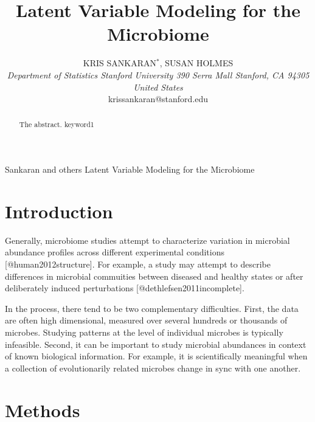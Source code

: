 \documentclass[oupdraft]{bio}
\begin{document}
\title{Latent Variable Modeling for the Microbiome} 

\author{
  KRIS SANKARAN$^\ast$, SUSAN HOLMES\\[4pt]
  \textit{
    Department of Statistics
    Stanford University
    390 Serra Mall
    Stanford, CA 94305
    United States
  } \\[2pt]
  {krissankaran@stanford.edu}
}

\markboth
{Sankaran and others}
{Latent Variable Modeling for the Microbiome}

\maketitle


\begin{abstract}
  {
    The abstract.
  }
  {
    keyword1
  }
\end{abstract}

\section{Introduction}

Generally, microbiome studies attempt to characterize variation in microbial
abundance profiles across different experimental conditions
[@human2012structure]. For example, a study may attempt to describe differences
in microbial commuities between diseased and healthy states or after
deliberately induced perturbations [@dethlefsen2011incomplete].

In the process, there tend to be two complementary difficulties. First, the data
are often high dimensional, measured over several hundreds or thousands of
microbes. Studying patterns at the level of individual microbes is typically
infeasible. Second, it can be important to study microbial abundances in context
of known biological information. For example, it is scientifically meaningful
when a collection of evolutionarily related microbes change in sync with one
another.


\section{Methods}
\end{document}

